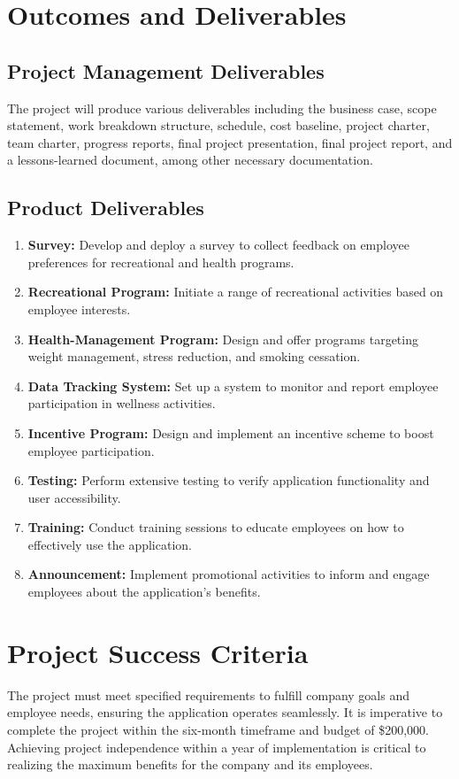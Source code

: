 \documentclass{article}
\begin{document}
\section*{Outcomes and Deliverables}
\subsection*{Project Management Deliverables}
The project will produce various deliverables including the business case, scope statement, work breakdown structure, schedule, cost baseline, project charter, team charter, progress reports, final project presentation, final project report, and a lessons-learned document, among other necessary documentation.

\subsection*{Product Deliverables}
\begin{enumerate}[label=\arabic*.]
    \item \textbf{Survey:} Develop and deploy a survey to collect feedback on employee preferences for recreational and health programs.
    \item \textbf{Recreational Program:} Initiate a range of recreational activities based on employee interests.
    \item \textbf{Health-Management Program:} Design and offer programs targeting weight management, stress reduction, and smoking cessation.
    \item \textbf{Data Tracking System:} Set up a system to monitor and report employee participation in wellness activities.
    \item \textbf{Incentive Program:} Design and implement an incentive scheme to boost employee participation.
    \item \textbf{Testing:} Perform extensive testing to verify application functionality and user accessibility.
    \item \textbf{Training:} Conduct training sessions to educate employees on how to effectively use the application.
    \item \textbf{Announcement:} Implement promotional activities to inform and engage employees about the application's benefits.
\end{enumerate}

\section*{Project Success Criteria}
The project must meet specified requirements to fulfill company goals and employee needs, ensuring the application operates seamlessly. It is imperative to complete the project within the six-month timeframe and budget of \$200,000. Achieving project independence within a year of implementation is critical to realizing the maximum benefits for the company and its employees.
\end{document}
